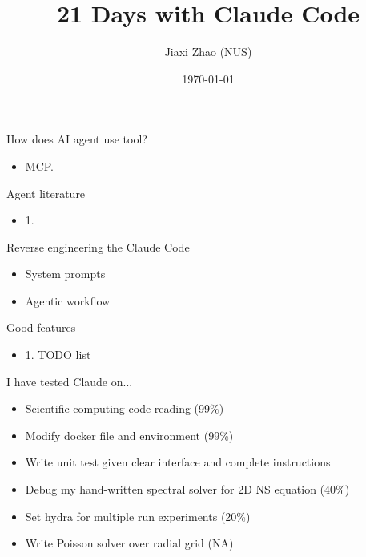 \documentclass[aspectratio=169]{beamer}
\title[Code Agent]{21 Days with Claude Code}
\author[J. Zhao]{Jiaxi Zhao (NUS)}
\date[\today]{\today}
\begin{document}

\begin{frame}
\titlepage
\end{frame}


\begin{frame}{How does AI agent use tool?}
	\begin{itemize}
		\item MCP. 
	\end{itemize}
\end{frame}


\begin{frame}{Agent literature}
	\begin{itemize}
		\item 1. 
	\end{itemize}
\end{frame}


\begin{frame}{Reverse engineering the Claude Code}
	\begin{itemize}
		\item System prompts
		\item Agentic workflow 
	\end{itemize}
\end{frame}


\begin{frame}{Good features}
	\begin{itemize}
		\item 1. TODO list
	\end{itemize}
\end{frame}


\begin{frame}{I have tested Claude on...}
	\begin{itemize}
		\item Scientific computing code reading (99\%)
		\item Modify docker file and environment (99\%)
		\item Write unit test given clear interface and complete instructions
		\item Debug my hand-written spectral solver for 2D NS equation (40\%)
		\item Set hydra for multiple run experiments (20\%)
		\item Write Poisson solver over radial grid (NA)
	\end{itemize}
\end{frame}
\end{document}

